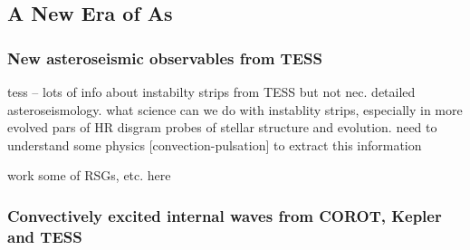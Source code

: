{\color{blue}
\subsection{A New Era of As}



\subsubsection{New asteroseismic observables from TESS}

tess -- lots of info about instabilty strips from TESS but not nec. detailed asteroseismology.  what science can we do with instablity strips, especially in more evolved pars of HR disgram  probes of stellar structure and evolution.   need to understand some physics [convection-pulsation] to extract this information

work some of RSGs, etc. here

\subsubsection{Convectively excited internal waves from COROT, Kepler and TESS}


}